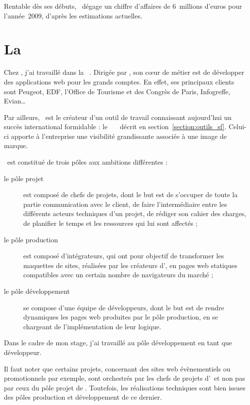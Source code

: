 Rentable dès ses débuts, \asensio\ dégage un chiffre d'affaires de 6~millions d'euros pour l'année~2009, d'après les estimations actuelles.


\section{La \abufull\ \asl}

Chez \asensio, j'ai travaillé dans la \abufull\ \asl. Dirigée par \apotencier, son cœur de métier est de développer des applications web pour les grands comptes. En effet, ses principaux clients sont Peugeot, EDF, l'Office de Tourisme et des Congrès de Paris, Infogreffe, Evian\dots

Par ailleurs, \asl\ est le créateur d'un outil de travail connaissant aujourd'hui un succès international formidable : le \afm\ \aphp\ \asf\ décrit en section~\ref{section:outils_sf}. Celui-ci apporte à l'entreprise une visibilité grandissante associée à une image de marque. 

\asl\ est constitué de trois pôles aux ambitions différentes :

\begin{description}
	\item[le pôle projet] est composé de chefs de projets, dont le but est de s'occuper de toute la partie communication avec le client, de faire l'intermédiaire entre les différents acteurs techniques d'un projet, de rédiger son cahier des charges, de planifier le temps et les ressources qui lui sont affectés ;
	\item[le pôle production] est composé d'intégrateurs, qui ont pour objectif de transformer les maquettes de sites, réalisées par les créateurs d'\aes, en pages web statiques compatibles avec un certain nombre de navigateurs du marché ;
	\item[le pôle développement] se compose d'une équipe de développeurs, dont le but est de rendre dynamiques les pages web produites par le pôle production, en se chargeant de l'implémentation de leur logique.
\end{description}

Dans le cadre de mon stage, j'ai travaillé au pôle développement en tant que développeur.

Il faut noter que certains projets, concernant des sites web évènementiels ou promotionnels par exemple, sont orchestrés par les chefs de projets d'\aes\ et non pas par ceux du pôle projet de \asl. Toutefois, les réalisations techniques sont bien issues des pôles production et développement de ce dernier.



